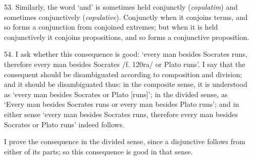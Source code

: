 \begin{enumerate}
\item[53.] Similarly, the word `and' is sometimes held conjunctly (\textit{copulatim}) and sometimes conjunctively (\textit{copulative}). Conjunctly when it conjoins terms, and so forms a conjunction from conjoined extremes; but when it is held conjunctively it conjoins propositions, and so forms a conjunctive proposition.
\item[54.] I ask whether this consequence is good: `every man besides Socrates runs, therefore every man besides Socrates /f. 120ra/ or Plato runs'. I say that the consequent should be disambiguated according to composition and division; and it should be disambiguated thus: in the composite sense, it is understood as `every man besides Socrates or Plato [runs]'; in the divided sense, as `Every man besides Socrates runs or every man besides Plato runs'; and in either sense `every man besides Socrates runs, therefore every man besides Socrates or Plato runs' indeed follows.

I prove the consequence in the divided sense, since a disjunctive follows from either of its parts; so this consequence is good in that sense.


\end{enumerate}
